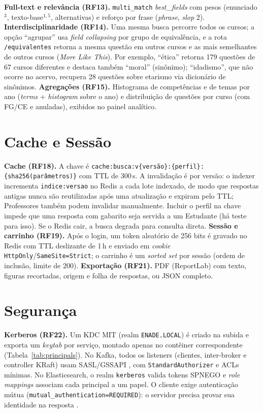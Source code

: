 \documentclass[12pt]{article}
\newcommand{\cod}[1]{\texttt{\small #1}}
\begin{document}
\textbf{Full-text e relevância (RF13).} \cod{multi\_match} \textit{best\_fields} com pesos (enunciado$^3$,
texto-base$^{1{,}5}$, alternativas) e reforço por frase (\textit{phrase}, \textit{slop} 2). \textbf{Interdisciplinaridade
(RF14).} Uma mesma busca percorre todos os cursos; a opção ``agrupar'' usa \textit{field collapsing} por grupo de
equivalência, e a rota \cod{/equivalentes} retorna a mesma questão em outros cursos e as mais semelhantes de
outros cursos (\textit{More Like This}). Por exemplo, ``ética'' retorna 179 questões de 67 cursos diferentes e
destaca também ``moral'' (sinônimo); ``idadismo'', que não ocorre no acervo, recupera 28 questões sobre
etarismo via dicionário de sinônimos. \textbf{Agregações (RF15).} Histograma de competências e de temas por ano
(\textit{terms} + \textit{histogram} sobre o ano) e distribuição de questões por curso (com FG/CE e anuladas),
exibidos no painel analítico.

\section{Cache e Sessão}\label{sec:cache}

\textbf{Cache (RF18).} A chave é \cod{cache:busca:v\{versão\}:\{perfil\}:\{sha256(parâmetros)\}} com TTL de 300\,s.
A invalidação é por versão: o indexer incrementa \cod{indice:versao} no Redis a cada lote indexado, de modo que
respostas antigas nunca são reutilizadas após uma atualização e expiram pelo TTL; Professores também podem
invalidar manualmente. Incluir o perfil na chave impede que uma resposta com gabarito seja servida a um
Estudante (há teste para isso). Se o Redis cair, a busca degrada para consulta direta. \textbf{Sessão e
carrinho (RF19).} Após o login, um token aleatório de 256 bits é gravado no Redis com TTL deslizante de 1\,h e
enviado em \textit{cookie} \cod{HttpOnly}/\cod{SameSite=Strict}; o carrinho é um \textit{sorted set} por sessão
(ordem de inclusão, limite de 200). \textbf{Exportação (RF21).} PDF (ReportLab) com texto, figuras recortadas,
origem e folha de respostas, ou JSON completo.

\section{Segurança}\label{sec:seguranca}

\textbf{Kerberos (RF22).} Um KDC MIT (realm \cod{ENADE.LOCAL}) é criado na subida e exporta um
\textit{keytab} por serviço, montado apenas no contêiner correspondente (Tabela~\ref{tab:principals}). No
Kafka, todos os listeners (clientes, inter-broker e controller KRaft) usam SASL/GSSAPI \cite{kafkadocs}, com
\cod{StandardAuthorizer} e ACLs mínimas. No Elasticsearch, o realm \cod{kerberos} valida tokens SPNEGO
\cite{elastickerberos} e \textit{role mappings} associam cada principal a um papel. O cliente exige
autenticação mútua (\cod{mutual\_authentication=REQUIRED}): o servidor precisa provar sua identidade na
resposta \cite{neuman1994kerberos}.
\end{document}
